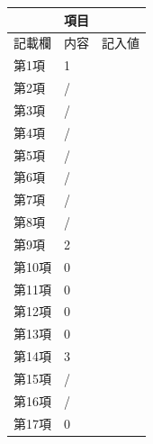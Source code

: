 \documentclass[UTF8,10pt,a4paper,fontset=fandol]{ctexart}
\newcommand{\fieldvalue}[1]{#1}
\newcommand{\handwritten}[1]{#1}
\begin{document}
\begin{tabularx}{\textwidth}{|p{}|X|p{}|}
\hline
\multicolumn{3}{|c|}{項目}\\
\hline
記載欄 &
内容 &
記入値\\
\hline
第1項 &
\fieldvalue{\handwritten{1}} &
\\
\hline
第2項 &
\fieldvalue{\handwritten{/}} &
\\
\hline
第3項 &
\fieldvalue{\handwritten{/}} &
\\
\hline
第4項 &
\fieldvalue{\handwritten{/}} &
\\
\hline
第5項 &
\fieldvalue{\handwritten{/}} &
\\
\hline
第6項 &
\fieldvalue{\handwritten{/}} &
\\
\hline
第7項 &
\fieldvalue{\handwritten{/}} &
\\
\hline
第8項 &
\fieldvalue{\handwritten{/}} &
\\
\hline
第9項 &
\fieldvalue{\handwritten{2}} &
\\
\hline
第10項 &
\fieldvalue{\handwritten{0}} &
\\
\hline
第11項 &
\fieldvalue{\handwritten{0}} &
\\
\hline
第12項 &
\fieldvalue{\handwritten{0}} &
\\
\hline
第13項 &
\fieldvalue{\handwritten{0}} &
\\
\hline
第14項 &
\fieldvalue{\handwritten{3}} &
\\
\hline
第15項 &
\fieldvalue{\handwritten{/}} &
\\
\hline
第16項 &
\fieldvalue{\handwritten{/}} &
\\
\hline
第17項 &
\fieldvalue{\handwritten{0}} &
\\
\hline
\end{tabularx}
\end{document}
